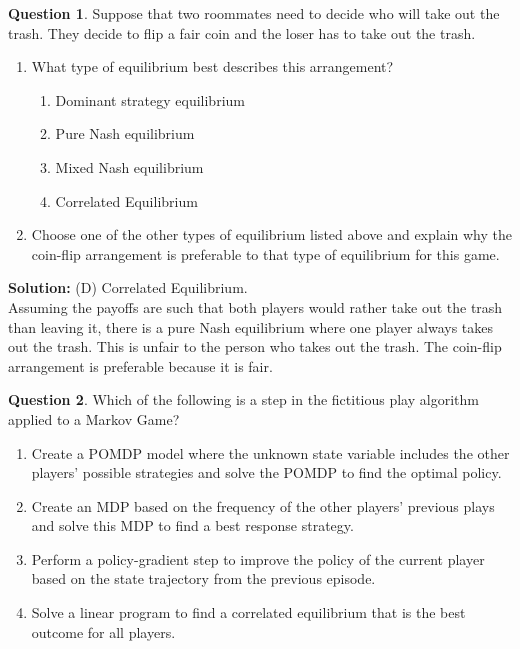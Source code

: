 \documentclass{article}
\theoremstyle{definition}
\newtheorem{question}{Question}
\begin{document}
\begin{question}
    Suppose that two roommates need to decide who will take out the trash. They decide to flip a fair coin and the loser has to take out the trash.
    \begin{enumerate}
    \item What type of equilibrium best describes this arrangement?
        \begin{enumerate}[label=(\Alph*)]
            \item Dominant strategy equilibrium
            \item Pure Nash equilibrium
            \item Mixed Nash equilibrium
            \item Correlated Equilibrium
        \end{enumerate}
    \item Choose one of the other types of equilibrium listed above and explain why the coin-flip arrangement is preferable to that type of equilibrium for this game.
    \end{enumerate}
\end{question}

\noindent\textbf{Solution:}
(D) Correlated Equilibrium.\\
Assuming the payoffs are such that both players would rather take out the trash than leaving it, there is a pure Nash equilibrium where one player always takes out the trash. This is unfair to the person who takes out the trash. The coin-flip arrangement is preferable because it is fair.

\begin{question}
Which of the following is a step in the fictitious play algorithm applied to a Markov Game?

\begin{enumerate}[label=(\Alph*)]
    \item Create a POMDP model where the unknown state variable includes the other players' possible strategies and solve the POMDP to find the optimal policy. \\
    \item Create an MDP based on the frequency of the other players' previous plays and solve this MDP to find a best response strategy. \\
    \item Perform a policy-gradient step to improve the policy of the current player based on the state trajectory from the previous episode. \\
    \item Solve a linear program to find a correlated equilibrium that is the best outcome for all players.
\end{enumerate}
\end{question}
\end{document}
